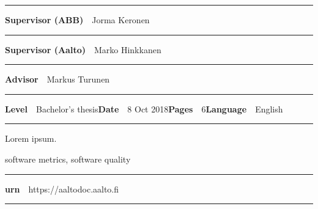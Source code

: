 \begin{spacing}{.88}
{\vspace{-2.4mm}\rule{\textwidth}{.75pt}

{\fontsize{10.5pt}{10.5pt}\bfseries\sffamily\lsstyle Supervisor (ABB)}~~{\small Jorma Keronen}

\vspace{-2.4mm}\rule{\textwidth}{.75pt}

{\fontsize{10.5pt}{10.5pt}\bfseries\sffamily\lsstyle Supervisor (Aalto)}~~{\small Marko Hinkkanen}

\vspace{-2.4mm}\rule{\textwidth}{.75pt}

{\fontsize{10.5pt}{10.5pt}\bfseries\sffamily\lsstyle Advisor}~~{\small Markus Turunen}

\vspace{-2.4mm}\rule{\textwidth}{.75pt}

{\fontsize{10.5pt}{10.5pt}\bfseries\sffamily\lsstyle Level}~~{\small Bachelor's thesis}\hfill{\fontsize{10.5pt}{10.5pt}\bfseries\sffamily\lsstyle Date}~~{\small 8 Oct 2018}\hfill{\fontsize{10.5pt}{10.5pt}\bfseries\sffamily\lsstyle Pages}~~{\small 6}\hfill{\fontsize{10.5pt}{10.5pt}\bfseries\sffamily\lsstyle Language}~~{\small English}

\vspace{-2.4mm}\rule{\textwidth}{.75pt}

\vspace{6mm}

} %
\end{spacing}
\begin{spacing}{1.05}

\vspace{.8mm}

{\small
  Lorem ipsum.
}

\vfill

\end{spacing}
\begin{spacing}{.88}
{\parindent0pt %

\parbox[t]{123.6mm}{\raggedright\small software metrics, software quality}

\vspace{.5mm}\rule{\textwidth}{.75pt}

{\fontsize{10.5pt}{10.5pt}\bfseries\sffamily\lsstyle urn}~~{\small https://aaltodoc.aalto.fi}

\vspace{-2.4mm}\rule{\textwidth}{.75pt}

} %
\end{spacing}



